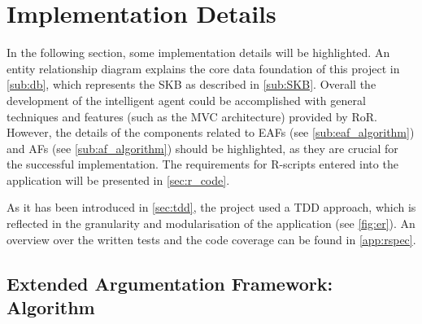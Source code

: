 \section{Implementation Details}
\label{sec:implementation}
In the following section, some implementation details will be highlighted. An entity relationship diagram explains the core data foundation of this project in \autoref{sub:db}, which represents the \gls{SKB} as described in \autoref{sub:SKB}. Overall the development of the intelligent agent could be accomplished with general techniques and features (such as the \gls{MVC} architecture) provided by \gls{RoR}. However, the details of the components related to \glspl{EAF} (see \autoref{sub:eaf_algorithm}) and \glspl{AF} (see \autoref{sub:af_algorithm}) should be highlighted, as they are crucial for the successful implementation. The requirements for \gls{R}-scripts entered into the application will be presented in \autoref{sec:r_code}.

As it has been introduced in \autoref{sec:tdd}, the project used a \gls{TDD} approach, which is reflected in the granularity and modularisation of the application (see \autoref{fig:er}). An overview over the written tests and the code coverage can be found in \autoref{app:rspec}.
	




\subsection{Extended Argumentation Framework: Algorithm}
\label{sub:eaf_algorithm}

